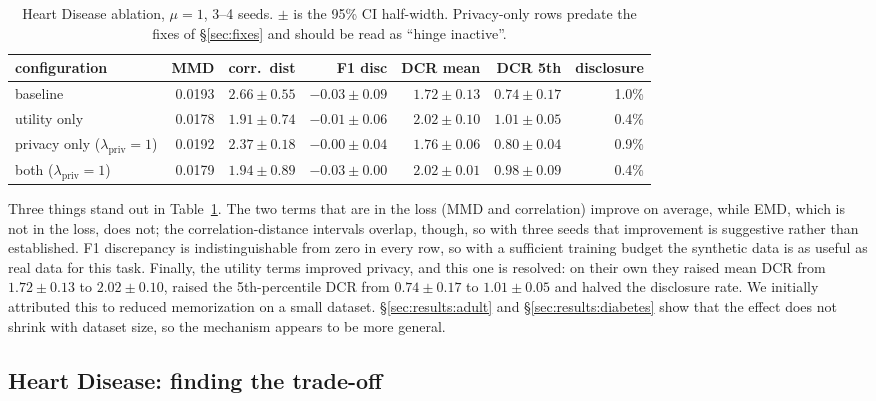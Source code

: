 \documentclass[11pt,a4paper]{article}
\newcommand{\lpriv}{\lambda_{\text{priv}}}
\begin{document}
\begin{table}[htbp]
\caption{Heart Disease ablation, $\mu = 1$, 3--4 seeds. $\pm$ is the 95\% CI
half-width. Privacy-only rows predate the fixes of \S\ref{sec:fixes} and
should be read as ``hinge inactive''.}
\label{tab:heart-ablation}
\centering\small
\begin{adjustbox}{max width=\textwidth}
\begin{tabular}{@{}lrrrrrr@{}}
\toprule
configuration & MMD & corr.\ dist & F1 disc & DCR mean & DCR 5th & disclosure \\
\midrule
baseline      & 0.0193 & $2.66 \pm 0.55$ & $-0.03 \pm 0.09$ & $1.72 \pm 0.13$ & $0.74 \pm 0.17$ & 1.0\% \\
utility only  & 0.0178 & $1.91 \pm 0.74$ & $-0.01 \pm 0.06$ & $2.02 \pm 0.10$ & $1.01 \pm 0.05$ & 0.4\% \\
privacy only ($\lpriv=1$) & 0.0192 & $2.37 \pm 0.18$ & $-0.00 \pm 0.04$ & $1.76 \pm 0.06$ & $0.80 \pm 0.04$ & 0.9\% \\
both ($\lpriv=1$) & 0.0179 & $1.94 \pm 0.89$ & $-0.03 \pm 0.00$ & $2.02 \pm 0.01$ & $0.98 \pm 0.09$ & 0.4\% \\
\bottomrule
\end{tabular}
\end{adjustbox}
\end{table}

Three things stand out in Table~\ref{tab:heart-ablation}. The two terms that
are in the loss (MMD and correlation) improve on average, while EMD, which is
not in the loss, does not; the correlation-distance intervals overlap, though,
so with three seeds that improvement is suggestive rather than established.
F1 discrepancy is indistinguishable from zero in every row, so with a
sufficient training budget the synthetic data is as useful as real data for
this task. Finally, the utility terms improved privacy, and this one is
resolved: on their own they raised mean DCR from $1.72 \pm 0.13$ to
$2.02 \pm 0.10$, raised the 5th-percentile DCR from $0.74 \pm 0.17$ to
$1.01 \pm 0.05$ and halved the disclosure rate. We initially attributed this
to reduced memorization on a small dataset. \S\ref{sec:results:adult} and
\S\ref{sec:results:diabetes} show that the effect does not shrink with dataset
size, so the mechanism appears to be more general.

\subsection{Heart Disease: finding the trade-off}
\label{sec:results:heart-curve}
\end{document}
